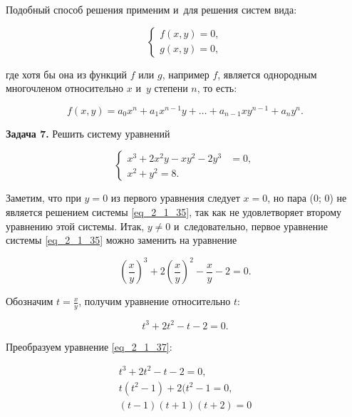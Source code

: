 Подобный способ решения применим и~для решения систем вида:

\begin{equation}\label{eq_2_1_34}
\begin{cases}
f(x, y) = 0, \\
g(x, y) = 0,
\end{cases}
\end{equation}

\noindent
где хотя бы она из функций $f$ или $g$, например $f$, является однородным многочленом
относительно $x$ и~$y$ степени $n$, то есть:

\begin{equation*}
f(x, y) = a_{0}x^{n} + a_{1}x^{n-1}y + \dots + a_{n-1}xy^{n-1} + a_{n}y^{n}.
\end{equation*}

\textbf{Задача 7.} Решить систему уравнений

\begin{equation}\label{eq_2_1_35}
\begin{cases}
x^{3} + 2x^{2}y - xy^{2} - 2y^{3} &= 0, \\
x^{2} + y^{2} = 8.
\end{cases}
\end{equation}

Заметим, что при $y = 0$ из первого уравнения следует $x = 0$,
но пара (0; 0) не является решением системы \eqref{eq_2_1_35},
так как не удовлетворяет второму уравнению этой системы.
Итак, $y \ne 0$ и~следовательно, первое уравнение системы \eqref{eq_2_1_35}
можно заменить на уравнение

\begin{equation}\label{eq_2_1_36}
\displaystyle
\left(
\frac{x}{y}
\right)^{3} +
2\left(
\frac{x}{y}
\right)^{2} -
\frac{x}{y} -
2 = 0.
\end{equation}

Обозначим $\displaystyle t = \frac{x}{y}$, получим уравнение относительно $t$:

\begin{equation}\label{eq_2_1_37}
t^{3} + 2t^{2} - t - 2 = 0.
\end{equation}

Преобразуем уравнение \eqref{eq_2_1_37}:

\begin{gather*}
t^{3} + 2t^{2} - t - 2 = 0, \\
t(t^{2} - 1) + 2(t^{2} - 1 = 0, \\
(t - 1)(t + 1)(t + 2) = 0
\end{gather*}


